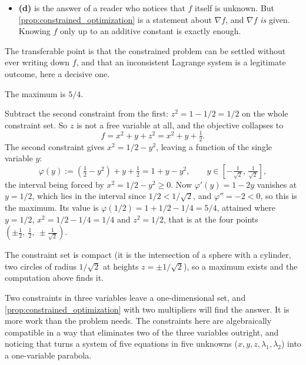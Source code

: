 \begin{exercisesolution}
\begin{remark}
\begin{itemize}
    section a circle and does nothing to the first Lagrange equation, which is where the
    obstruction lives.
  \item \textbf{(d)} is the answer of a reader who notices that $f$ itself is unknown. But
    \cref{prop:constrained_optimization} is a statement about $\nabla f$, and $\nabla f$ \emph{is}
    given. Knowing $f$ only up to an additive constant is exactly enough.
\end{itemize}
The transferable point is that the constrained problem can be settled without ever writing down
$f$, and that an inconsistent Lagrange system is a legitimate outcome, here a decisive one.
\end{remark}
\end{exercisesolution}

\begin{exercisesolution}
\label{sol:kobel_sphere_meets_cylinder}
The maximum is $\boxed{5/4}$.

Subtract the second constraint from the first: $z^2 = 1 - 1/2 = 1/2$ on the whole constraint set.
So $z$ is not a free variable at all, and the objective collapses to
\[f = x^2 + y + z^2 = x^2 + y + \tfrac12 .\]
The second constraint gives $x^2 = 1/2 - y^2$, leaving a function of the single variable $y$:
\[\varphi(y) := \left(\tfrac12 - y^2\right) + y + \tfrac12 = 1 + y - y^2,
  \qquad y \in \left[-\tfrac{1}{\sqrt2},\,\tfrac{1}{\sqrt2}\right],\]
the interval being forced by $x^2 = 1/2-y^2 \ge 0$. Now $\varphi'(y) = 1-2y$ vanishes at
$y = 1/2$, which lies in the interval since $1/2 < 1/\sqrt2$, and $\varphi'' = -2 < 0$, so this is
the maximum. Its value is $\varphi(1/2) = 1 + 1/2 - 1/4 = 5/4$, attained where $y = 1/2$,
$x^2 = 1/2-1/4 = 1/4$ and $z^2 = 1/2$, that is at the four points
$\left(\pm\tfrac12,\ \tfrac12,\ \pm\tfrac{1}{\sqrt2}\right)$.

The constraint set is compact (it is the intersection of a sphere with a cylinder, two circles
of radius $1/\sqrt{2}$ at heights $z = \pm 1/\sqrt2$), so a maximum exists and the computation
above finds it.
\begin{remark}
\label{rem:constraints_before_multipliers}
Two constraints in three variables leave a one-dimensional set, and \cref{prop:constrained_optimization}
with two multipliers will find the answer. It is more work than the problem needs. The constraints
here are algebraically compatible in a way that eliminates two of the three variables outright, and
noticing that turns a system of five equations in five unknowns ($x,y,z,\lambda_1,\lambda_2$)
into a one-variable parabola.


\end{remark}
\end{exercisesolution}
